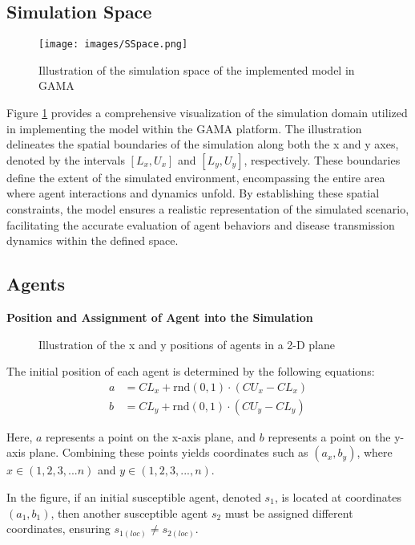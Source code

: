   \subsection{ Simulation Space}
  \label{SSpace}
\begin{figure}[H]
	\centering
		{\texttt{[image: images/SSpace.png]}}
	\caption{Illustration of the simulation space of the implemented model in GAMA}
	\label{space}
\end{figure}


Figure \ref{space} provides a comprehensive visualization of the simulation domain utilized in implementing the model within the GAMA platform. The illustration delineates the spatial boundaries of the simulation along both the x and y axes, denoted by the intervals $[L_x, U_x]$ and $[L_y, U_y]$, respectively. These boundaries define the extent of the simulated environment, encompassing the entire area where agent interactions and dynamics unfold. By establishing these spatial constraints, the model ensures a realistic representation of the simulated scenario, facilitating the accurate evaluation of agent behaviors and disease transmission dynamics within the defined space.

\subsection{Agents}

\textbf{\large{Position and Assignment of Agent into the Simulation}}
\label{Pos}
\begin{figure}[H]
	\caption{Illustration of the x and y positions of agents in a 2-D plane}
	\label{pos}
\end{figure}

The initial position of each agent is determined by the following equations:
\begin{align*}
	a &= CL_x + \text{rnd}(0,1) \cdot (CU_x - CL_x) \\
	b &= CL_y + \text{rnd}(0,1) \cdot (CU_y - CL_y)
\end{align*}

Here, $a$ represents a point on the x-axis plane, and $b$ represents a point on the y-axis plane. Combining these points yields coordinates such as $(a_x, b_y)$, where $x \in (1, 2, 3,...n)$ and $y \in (1, 2, 3,...,n)$.

In the figure, if an initial susceptible agent, denoted $s_1$, is located at coordinates $(a_1, b_1)$, then another susceptible agent $s_2$ must be assigned different coordinates, ensuring $s_{1(loc)} \neq s_{2(loc)}$.

